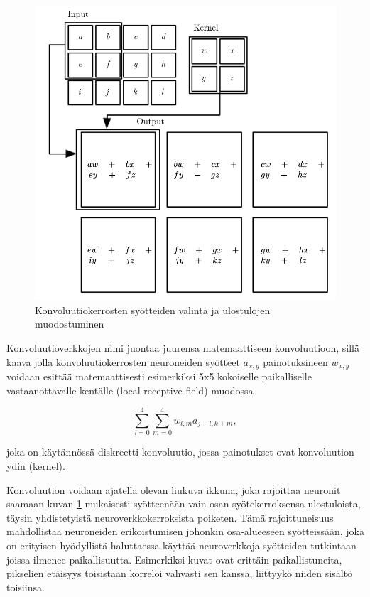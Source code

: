 \documentclass[finnish]{tktltiki2}
\theoremstyle{definition}
\theoremstyle{remark}
\begin{document}
    \begin{figure}[h]
      \centering
      \includegraphics[scale=0.4]{convolution}
      \caption{Konvoluutiokerrosten syötteiden valinta ja ulostulojen muodostuminen \cite{Goodfellow-et-al-2016}}
      \label{pic:convolution}
    \end{figure}

    Konvoluutioverkkojen nimi juontaa juurensa matemaattiseen konvoluutioon, sillä kaava jolla konvoluutiokerrosten neuroneiden syötteet $a_{x,y}$ painotuksineen $w_{x,y}$ voidaan esittää matemaattisesti esimerkiksi 5x5 kokoiselle paikalliselle vastaanottavalle kentälle (local receptive field) muodossa

    $$ \sum_{l=0}^{4}\sum_{m=0}^{4} w_{l,m}a_{j+l,k+m},$$
    
    joka on käytännössä diskreetti konvoluutio, jossa painotukset ovat konvoluution ydin (kernel).

    Konvoluution voidaan ajatella olevan liukuva ikkuna, joka rajoittaa neuronit saamaan kuvan \ref{pic:convolution} mukaisesti syötteenään vain osan syötekerroksensa ulostuloista, täysin yhdistetyistä neuroverkkokerroksista poiketen. Tämä rajoittuneisuus mahdollistaa neuroneiden erikoistumisen johonkin osa-alueeseen syötteissään, joka on erityisen hyödyllistä haluttaessa käyttää neuroverkkoja syötteiden tutkintaan joissa ilmenee paikallisuutta. Esimerkiksi kuvat ovat erittäin paikallistuneita, pikselien etäisyys toisistaan korreloi vahvasti sen kanssa, liittyykö niiden sisältö toisiinsa.
\end{document}
